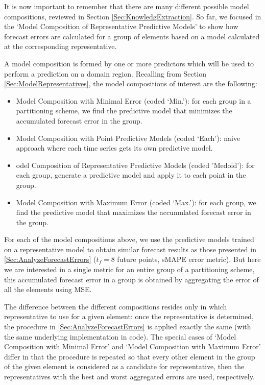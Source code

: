 It is now important to remember that there are many different possible model compositions, reviewed in Section \ref{Sec:KnowledgExtraction}. So far, we focused in the `Model Composition of Representative Predictive Models' to show how forecast errors are calculated for a group of elements based on a model calculated at the corresponding representative. 

A model composition is formed by one or more predictors which will be used to perform a prediction on a domain region. Recalling from Section \ref{Sec:ModelRepresentatives}, the model compositions of interest are the following:

\begin{itemize}%
	\item Model Composition with Minimal Error (coded `Min.'): for each group in a partitioning scheme, we find the predictive model that minimizes the accumulated forecast error in the group. 
	\item Model Composition with Point Predictive Models (coded `Each'): naive approach where each time series gets its own predictive model.
	\item odel Composition of Representative Predictive Models (coded 'Medoid'): for each group, generate a predictive model and apply it to each point in the group.
	\item Model Composition with Maximum Error (coded `Max.'): for each group, we find the predictive model that maximizes the accumulated forecast error in the group.
\end{itemize}

For each of the model compositions above, we use the predictive models trained on a representative model to obtain similar forecast results as those presented in \ref{Sec:AnalyzeForecastErrors} ($t_f =8$ future points, sMAPE error metric). But here we are interested in a single metric for an entire group of a partitioning scheme, this accumulated forecast error in a group is obtained by aggregating the error of all the elements using MSE.

The difference between the different compositions resides only in which representative to use for a given element: once the representative is determined, the procedure in \ref{Sec:AnalyzeForecastErrors} is applied exactly the same (with the same underlying implementation in code). The special cases of `Model Composition with Minimal Error' and `Model Composition with Maximum Error' differ in that the procedure is repeated so that every other element in the group of the given element is considered as a candidate for representative, then the representatives with the best and worst aggregated errors are used, respectively.

